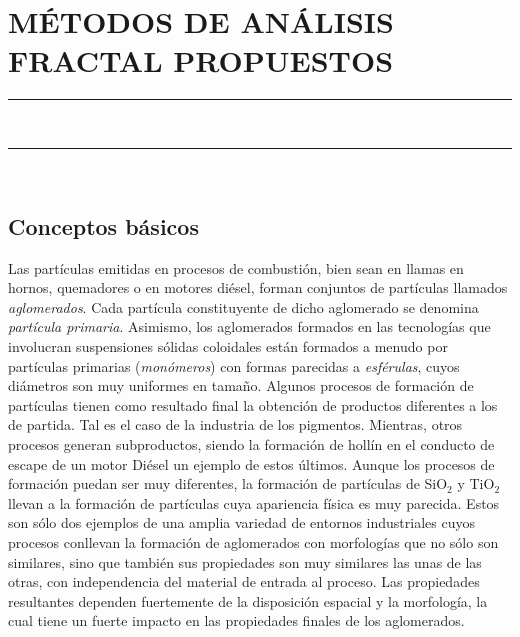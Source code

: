\pagestyle{plain}
\chapter{MÉTODOS DE ANÁLISIS FRACTAL PROPUESTOS}\label{cap:MetodosAnalisisFractalPropuestos}
\vspace{0.2cm}
\noindent\rule{\linewidth}{1.5pt}\\
\startcontents[chapters]
\vspace{0.2cm}
\noindent\rule{\linewidth}{1.3pt}\\
\newpage
\section{Conceptos básicos}\label{sec:ConceptosBasicos}
\par Las partículas emitidas en procesos de combustión, bien sean en llamas en hornos, quemadores o en motores diésel, forman conjuntos de partículas llamados  \emph{aglomerados}. Cada partícula constituyente de dicho aglomerado se denomina  \emph{partícula primaria}. Asimismo, los aglomerados formados en las tecnologías que involucran suspensiones sólidas coloidales están formados a menudo por partículas primarias (\emph{monómeros}) con formas parecidas a  \emph{esférulas}, cuyos diámetros son muy uniformes en tamaño. Algunos procesos de formación de partículas tienen como resultado final la obtención de productos diferentes a los de partida. Tal es el caso de la industria de los pigmentos. Mientras, otros procesos generan subproductos, siendo la formación de hollín en el conducto de escape de un motor Diésel un ejemplo de estos últimos. Aunque los procesos de formación puedan ser muy diferentes, la formación de partículas de SiO$_2$ y TiO$_2$ llevan a la formación de partículas cuya apariencia física es muy parecida. Estos son sólo dos ejemplos de una amplia variedad de entornos industriales cuyos procesos conllevan la formación de aglomerados con morfologías que no sólo son similares, sino que también sus propiedades son muy similares las unas de las otras, con independencia del material de entrada al proceso. Las propiedades resultantes dependen fuertemente de la disposición espacial y la morfología, la cual tiene un fuerte impacto en las propiedades finales de los aglomerados.

